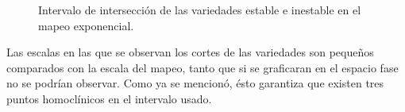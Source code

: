 \begin{figure}[htbp]
\centering
{}
\caption{Intervalo de intersección de las variedades estable e inestable en el mapeo exponencial.} \label{cruces_jung}
\end{figure}




Las escalas en las que se observan los cortes de las variedades son pequeños com\-pa\-ra\-dos con la escala del mapeo, tanto que si se graficaran en el espacio fase no se podrían observar. Como ya se mencionó, ésto garantiza que existen tres puntos homoclínicos en el intervalo usado. \\
\linebreak
\linebreak
\linebreak
\linebreak
\linebreak
\linebreak
\linebreak
\linebreak


